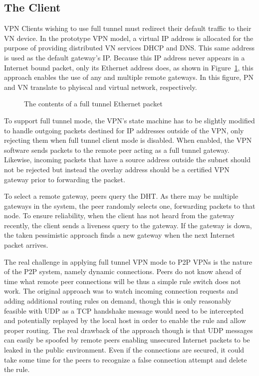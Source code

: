 \subsection{The Client}
VPN Clients wishing to use full tunnel must redirect their default traffic to
their VN device.  In the prototype VPN model, a virtual IP address is allocated
for the purpose of providing distributed VN services DHCP and DNS.  This same
address is used as the default gateway's IP.  Because this IP address never
appears in a Internet bound packet, only its Ethernet address does, as shown in
Figure~\ref{fig:tunnel_packet}, this approach enables the use of any and
multiple remote gateways.  In this figure, PN and VN translate to phyiscal and
virtual network, respectively.

\begin{figure}
\centering
{}
\caption{The contents of a full tunnel Ethernet packet}
\label{fig:tunnel_packet}
\end{figure}

To support full tunnel mode, the VPN's state machine has to be slightly modified
to handle outgoing packets destined for IP addresses outside of the VPN, only
rejecting them when full tunnel client mode is disabled.  When enabled, the VPN
software sends packets to the remote peer acting as a full tunnel gateway.
Likewise, incoming packets that have a source address outside the subnet should
not be rejected but instead the overlay address should be a certified VPN
gateway prior to forwarding the packet.

To select a remote gateway, peers query the DHT.  As there may be multiple
gateways in the system, the peer randomly selects one, forwarding packets to
that node.  To ensure reliability, when the client has not heard from the
gateway recently, the client sends a liveness query to the gateway.  If the
gateway is down, the taken pessimistic approach finds a new gateway when
the next Internet packet arrives.

The real challenge in applying full tunnel VPN mode to P2P VPNs is the nature
of the P2P system, namely dynamic connections.  Peers do not know ahead of time
what remote peer connections will be thus a simple rule switch does not work.
The original approach was to watch incoming connection requests and adding
additional routing rules on demand, though this is only reasonably feasible
with UDP as a TCP handshake message would need to be intercepted and potentially
replayed by the local host in order to enable the rule and allow proper routing.
The real drawback of the approach though is that UDP messages can easily be
spoofed by remote peers enabling unsecured Internet packets to be leaked in the
public environment.  Even if the connections are secured, it could take some
time for the peers to recognize a false connection attempt and delete the rule.

